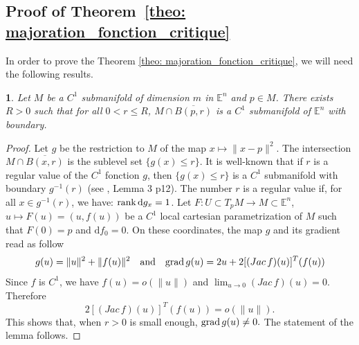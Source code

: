 \documentclass[11pt,reqno,a4paper]{article}%
\newtheorem{lemma}[theorem]{\sc{Lemma}}
\newtheorem{corollary}[theorem]{Corollary}
\theoremstyle{definition}
\theoremstyle{remark}
\renewcommand{\leq}{\leqslant}
\renewcommand{\d}{\mathrm{d}}
\newcommand{\E}{\mathbb{E}}
\renewcommand{\d}{\mathrm{d}}
\begin{document}


\subsection{Proof of Theorem~\ref{theo: majoration_fonction_critique}}\label{subsec:profftheme2}

In order to prove the Theorem \ref{theo: majoration_fonction_critique}, we will need the following results. 

\begin{lemma} \label{lem: intersection_variete_boule}
    Let $M$ be a $C^1$ submanifold of dimension $m$ in $\E^n$ and $p \in M$.
    There exists $R > 0$ such that for all $0 < r\leq R$,
    $M \cap \overline{B(p,r)}$
    is a $C^1$ submanifold of $\E^n$ with boundary.
\end{lemma}

\begin{proof}
    Let $g$ be the restriction  to $M$ of the map $x\mapsto \|x-p\|^2$.  The intersection $M \cap \overline{B(x,r)}$ is the sublevel set $\{g(x)\leq r\}.$ It is well-known that if $r$ is a regular value of the $C^1$ fonction $g$, then $\{g(x)\leq r\}$ is a $C^1$ submanifold with boundary $g^{-1}(r)$ (see \cite{Milnor1965}, Lemma 3 p12). The number $r$ is a regular value if, for all $x\in g^{-1}(r)$, we have: ${\rm rank\,} \d g_{x}=1$. Let $F:U\subset T_pM\to M\subset \E^n$, $u\mapsto F(u)=(u,f(u))$ be a $C^1$ local cartesian parametrization of $M$ such that $F(0)=p$ and $\d f_{0}=0.$ On these coordinates, the map $g$ and its gradient read as follow 
    \[g(u)=\|u\|^2+\|f(u)\|^2\quad\mbox{and}\quad {\rm grad}\, g (u) =2u+2[(Jac\,f)(u)]^T(f(u))\]
    Since $f$ is $C^1$, we have $f(u)=o(\|u\|)$ and $\lim_{u\to 0}(Jac\,f)(u)=0$. 
    Therefore
    \[2[(Jac\,f)(u)]^T(f(u))=o(\|u\|).\]
    This shows that, when $r>0$ is small enough, ${\rm grad}\, g (u)\neq 0.$ The statement of the lemma follows. 
\end{proof}
\end{document}
